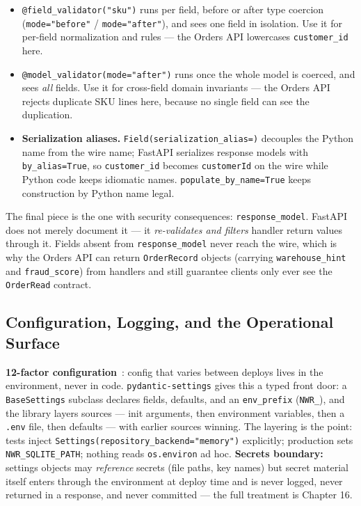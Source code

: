 \begin{itemize}
  \item \texttt{@field\_validator("sku")} runs per field, before or after
        type coercion (\texttt{mode="before"} / \texttt{mode="after"}), and
        sees one field in isolation. Use it for per-field normalization and
        rules --- the Orders API lowercases \texttt{customer\_id} here.
  \item \texttt{@model\_validator(mode="after")} runs once the whole model is
        coerced, and sees \emph{all} fields. Use it for cross-field domain
        invariants --- the Orders API rejects duplicate SKU lines here,
        because no single field can see the duplication.
  \item \textbf{Serialization aliases.} \texttt{Field(serialization\_alias=)}
        decouples the Python name from the wire name; FastAPI serializes
        response models with \texttt{by\_alias=True}, so
        \texttt{customer\_id} becomes \texttt{customerId} on the wire while
        Python code keeps idiomatic names. \texttt{populate\_by\_name=True}
        keeps construction by Python name legal.
\end{itemize}

The final piece is the one with security consequences:
\texttt{response\_model}. FastAPI does not merely document it --- it
\emph{re-validates and filters} handler return values through it. Fields
absent from \texttt{response\_model} never reach the wire, which is why the
Orders API can return \texttt{OrderRecord} objects (carrying
\texttt{warehouse\_hint} and \texttt{fraud\_score}) from handlers and still
guarantee clients only ever see the \texttt{OrderRead} contract.

\subsection{Configuration, Logging, and the Operational Surface}
\label{sec:ch6-ops}

\textbf{12-factor configuration}~\cite{twelvefactor}: config that varies
between deploys lives in the environment, never in code.
\texttt{pydantic-settings} gives this a typed front door: a
\texttt{BaseSettings} subclass declares fields, defaults, and an
\texttt{env\_prefix} (\texttt{NWR\_}), and the library layers sources ---
init arguments, then environment variables, then a \texttt{.env} file, then
defaults --- with earlier sources winning. The layering is the point: tests
inject \texttt{Settings(repository\_backend="memory")} explicitly; production
sets \texttt{NWR\_SQLITE\_PATH}; nothing reads \texttt{os.environ} ad hoc.
\textbf{Secrets boundary:} settings objects may \emph{reference} secrets
(file paths, key names) but secret material itself enters through the
environment at deploy time and is never logged, never returned in a response,
and never committed --- the full treatment is Chapter 16.

